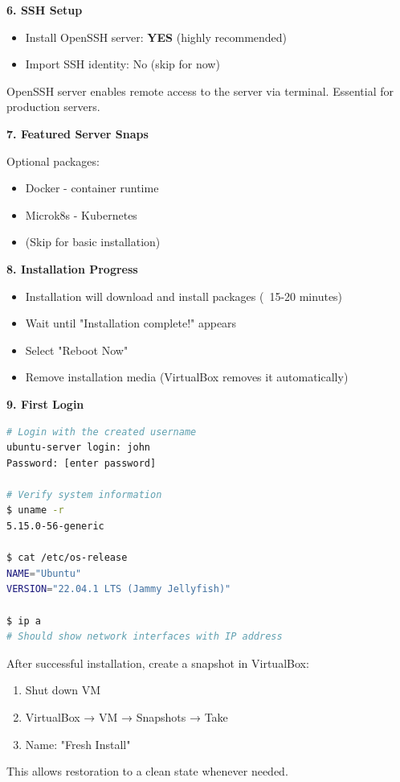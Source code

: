 \textbf{6. SSH Setup}

\begin{itemize}
    \item Install OpenSSH server: \textbf{YES} (highly recommended)
    \item Import SSH identity: No (skip for now)
\end{itemize}

\begin{notebox}
OpenSSH server enables remote access to the server via terminal. Essential for production servers.
\end{notebox}

\textbf{7. Featured Server Snaps}

Optional packages:
\begin{itemize}
    \item Docker - container runtime
    \item Microk8s - Kubernetes
    \item (Skip for basic installation)
\end{itemize}

\textbf{8. Installation Progress}

\begin{itemize}
    \item Installation will download and install packages (~15-20 minutes)
    \item Wait until "Installation complete!" appears
    \item Select "Reboot Now"
    \item Remove installation media (VirtualBox removes it automatically)
\end{itemize}

\textbf{9. First Login}

\begin{lstlisting}[language=bash, caption={Login and verify installation}]
# Login with the created username
ubuntu-server login: john
Password: [enter password]

# Verify system information
$ uname -r
5.15.0-56-generic

$ cat /etc/os-release
NAME="Ubuntu"
VERSION="22.04.1 LTS (Jammy Jellyfish)"

$ ip a
# Should show network interfaces with IP address
\end{lstlisting}

\begin{examplebox}[VM Snapshot]
After successful installation, create a snapshot in VirtualBox:
\begin{enumerate}
    \item Shut down VM
    \item VirtualBox → VM → Snapshots → Take
    \item Name: "Fresh Install"
\end{enumerate}

This allows restoration to a clean state whenever needed.
\end{examplebox}

